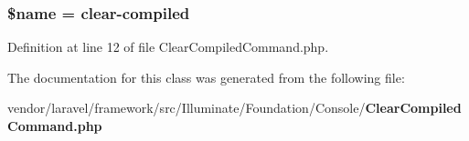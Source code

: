 \subsubsection[{\$name}]{\setlength{\rightskip}{0pt plus 5cm}\${\bf name} = \textquotesingle{}clear-\/compiled\textquotesingle{}\hspace{0.3cm}{\ttfamily [protected]}}\label{class_illuminate_1_1_foundation_1_1_console_1_1_clear_compiled_command_ab2fc40d43824ea3e1ce5d86dee0d763b}


Definition at line 12 of file Clear\+Compiled\+Command.\+php.



The documentation for this class was generated from the following file\+:\begin{DoxyCompactItemize}
\item 
vendor/laravel/framework/src/\+Illuminate/\+Foundation/\+Console/{\bf Clear\+Compiled\+Command.\+php}\end{DoxyCompactItemize}
